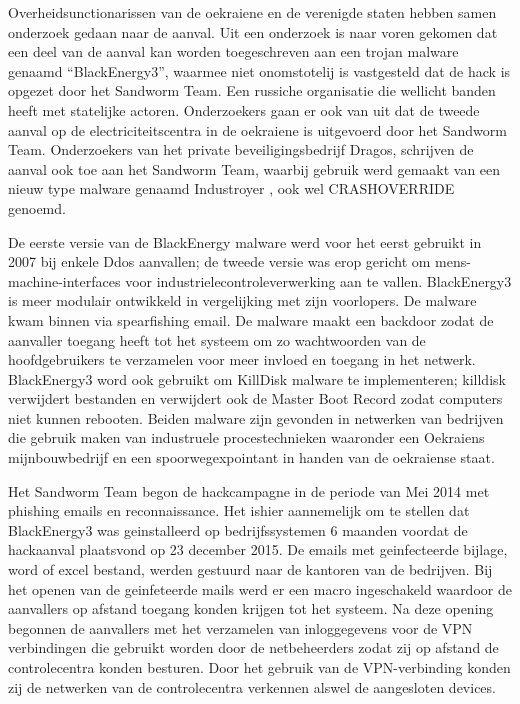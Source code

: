 {Overheidsunctionarissen van de oekraiene en de verenigde staten hebben samen onderzoek gedaan
naar de aanval. Uit een onderzoek is naar voren gekomen dat een deel van de aanval kan worden
toegeschreven aan een trojan malware genaamd “BlackEnergy3”, waarmee niet onomstotelij is
vastgesteld dat de hack is opgezet door het Sandworm Team. Een russiche organisatie die wellicht
banden heeft met statelijke actoren. Onderzoekers gaan er ook van uit dat de tweede aanval op de
electriciteitscentra in de oekraiene is uitgevoerd door het Sandworm Team. Onderzoekers van het
private beveiligingsbedrijf Dragos, schrijven de aanval ook toe aan het Sandworm Team, waarbij
gebruik werd gemaakt van een nieuw type malware genaamd Industroyer , ook wel CRASHOVERRIDE
genoemd.

De eerste versie van de BlackEnergy malware werd voor het eerst gebruikt in 2007 bij enkele Ddos
aanvallen; de tweede versie was erop gericht om mens-machine-interfaces voor
industrielecontroleverwerking aan te vallen. BlackEnergy3 is meer modulair ontwikkeld in
vergelijking met zijn voorlopers. De malware kwam binnen via spearfishing email. De malware maakt
een backdoor zodat de aanvaller toegang heeft tot het systeem om zo wachtwoorden van de
hoofdgebruikers te verzamelen voor meer invloed en toegang in het netwerk. BlackEnergy3 word
ook gebruikt om KillDisk malware te implementeren; killdisk verwijdert bestanden en verwijdert ook
de Master Boot Record zodat computers niet kunnen rebooten. Beiden malware zijn gevonden in
netwerken van bedrijven die gebruik maken van industruele procestechnieken waaronder een
Oekraiens mijnbouwbedrijf en een spoorwegexpointant in handen van de oekraiense staat.

Het Sandworm Team begon de hackcampagne in de periode van Mei 2014 met phishing emails en
reconnaissance. Het ishier aannemelijk om te stellen dat BlackEnergy3 was geinstalleerd op
bedrijfssystemen 6 maanden voordat de hackaanval plaatsvond op 23 december 2015. De emails
met geinfecteerde bijlage, word of excel bestand, werden gestuurd naar de kantoren van de
bedrijven. Bij het openen van de geinfeteerde mails werd er een macro ingeschakeld waardoor de
aanvallers op afstand toegang konden krijgen tot het systeem. Na deze opening begonnen de
aanvallers met het verzamelen van inloggegevens voor de VPN verbindingen die gebruikt worden
door de netbeheerders zodat zij op afstand de controlecentra konden besturen. Door het gebruik van
de VPN-verbinding konden zij de netwerken van de controlecentra verkennen alswel de aangesloten
devices.

}
